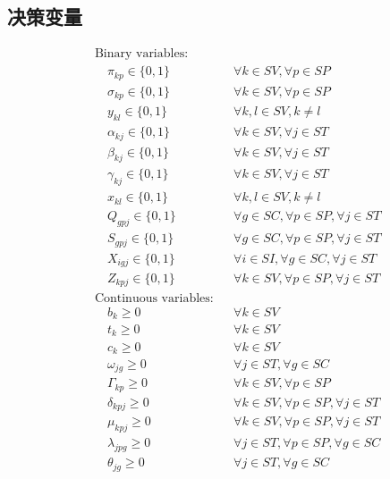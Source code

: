 \documentclass[11pt]{ctexart}
\begin{document}
\subsection*{决策变量}
\begin{align*}
& \text{Binary variables:} \\
& \quad \pi_{kp} \in \{0, 1\} && \forall k \in SV, \forall p \in SP \\
& \quad \sigma_{kp} \in \{0, 1\} && \forall k \in SV, \forall p \in SP \\
& \quad y_{kl} \in \{0, 1\} && \forall k, l \in SV, k \neq l \\
& \quad \alpha_{kj} \in \{0, 1\} && \forall k \in SV, \forall j \in ST \\
& \quad \beta_{kj} \in \{0, 1\} && \forall k \in SV, \forall j \in ST \\
& \quad \gamma_{kj} \in \{0, 1\} && \forall k \in SV, \forall j \in ST \\
& \quad x_{kl} \in \{0, 1\} && \forall k, l \in SV, k \neq l \\
& \quad Q_{gpj} \in \{0, 1\} && \forall g \in SC, \forall p \in SP, \forall j \in ST \\
& \quad S_{gpj} \in \{0, 1\} && \forall g \in SC, \forall p \in SP, \forall j \in ST \\
& \quad X_{igj} \in \{0, 1\} && \forall i \in SI, \forall g \in SC, \forall j \in ST \\
& \quad Z_{kpj} \in \{0, 1\} && \forall k \in SV, \forall p \in SP, \forall j \in ST \\
& \text{Continuous variables:} \\
& \quad b_k \ge 0 && \forall k \in SV \\
& \quad t_k \ge 0 && \forall k \in SV \\
& \quad c_k \ge 0 && \forall k \in SV \\
& \quad \omega_{jg} \ge 0 && \forall j \in ST, \forall g \in SC \\
& \quad \Gamma_{kp} \ge 0 && \forall k \in SV, \forall p \in SP \\
& \quad \delta_{kpj} \ge 0 && \forall k \in SV, \forall p \in SP, \forall j \in ST \\
& \quad \mu_{kpj} \ge 0 && \forall k \in SV, \forall p \in SP, \forall j \in ST \\
& \quad \lambda_{jpg} \ge 0 && \forall j \in ST, \forall p \in SP, \forall g \in SC \\
& \quad \theta_{jg} \ge 0 && \forall j \in ST, \forall g \in SC
\end{align*}
\end{document}
